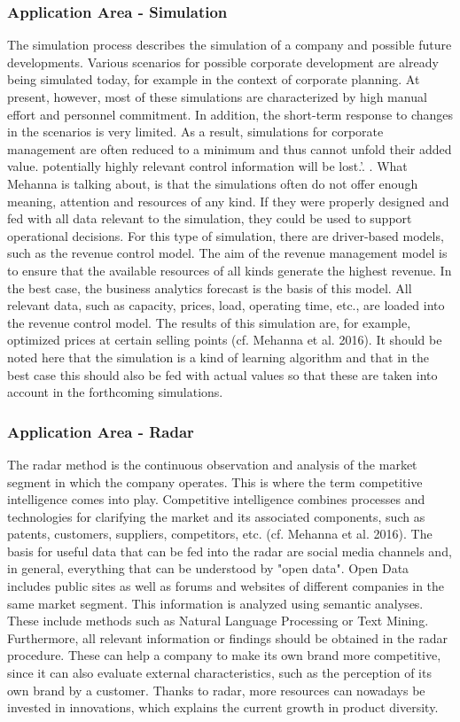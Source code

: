 \documentclass[12pt,twocolumn,twoside]{conference}   %
\begin{document}
\subsubsection{Application Area - Simulation}
The simulation process describes the simulation of a company and possible future developments. Various scenarios for possible corporate development are already being simulated today, for example in the context of corporate planning. At present, however, most of these simulations are characterized by high manual effort and personnel commitment. In addition, the short-term response to changes in the scenarios is very limited. As a result, simulations for corporate management are often reduced to a minimum and thus cannot unfold their added value. potentially highly relevant control information will be lost.'. \cite{PAPER-2}. What Mehanna is talking about, is that the simulations often do not offer enough meaning, attention and resources of any kind. If they were properly designed and fed with all data relevant to the simulation, they could be used to support operational decisions. For this type of simulation, there are driver-based models, such as the revenue control model. The aim of the revenue management model is to ensure that the available resources of all kinds generate the highest revenue. In the best case, the business analytics forecast is the basis of this model. All relevant data, such as capacity, prices, load, operating time, etc., are loaded into the revenue control model. The results of this simulation are, for example, optimized prices at certain selling points (cf. Mehanna et al. 2016). It should be noted here that the simulation is a kind of learning algorithm and that in the best case this should also be fed with actual values so that these are taken into account in the forthcoming simulations. 


\subsubsection{Application Area - Radar}
The radar method is the continuous observation and analysis of the market segment in which the company operates. This is where the term competitive intelligence comes into play. Competitive intelligence combines processes and technologies for clarifying the market and its associated components, such as patents, customers, suppliers, competitors, etc. (cf. Mehanna et al. 2016). The basis for useful data that can be fed into the radar are social media channels and, in general, everything that can be understood by "open data". Open Data includes public sites as well as forums and websites of different companies in the same market segment. This information is analyzed using semantic analyses. These include methods such as Natural Language Processing or Text Mining. Furthermore, all relevant information or findings should be obtained in the radar procedure. These can help a company to make its own brand more competitive, since it can also evaluate external characteristics, such as the perception of its own brand by a customer. Thanks to radar, more resources can nowadays be invested in innovations, which explains the current growth in product diversity.
\end{document}

